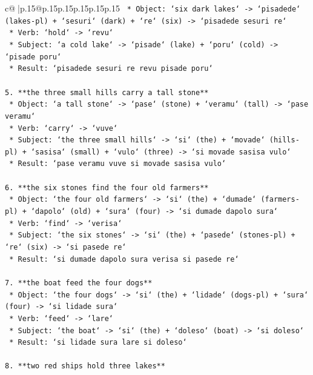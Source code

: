 \documentclass{article}
\begin{document}
{\begin{supertabular}{c@{$\;$}|p{.15\linewidth}@{}p{.15\linewidth}p{.15\linewidth}p{.15\linewidth}p{.15\linewidth}p{.15\linewidth}}
{{{\texttt{    *   Object: `six dark lakes` {-}> `pisadede` (lakes{-}pl) + `sesuri` (dark) + `re` (six) {-}> `pisadede sesuri re`} \\
\texttt{    *   Verb: `hold` {-}> `revu`} \\
\texttt{    *   Subject: `a cold lake` {-}> `pisade` (lake) + `poru` (cold) {-}> `pisade poru`} \\
\texttt{    *   Result: `pisadede sesuri re revu pisade poru`} \\
\\ 
\texttt{5.  **the three small hills carry a tall stone**} \\
\texttt{    *   Object: `a tall stone` {-}> `pase` (stone) + `veramu` (tall) {-}> `pase veramu`} \\
\texttt{    *   Verb: `carry` {-}> `vuve`} \\
\texttt{    *   Subject: `the three small hills` {-}> `si` (the) + `movade` (hills{-}pl) + `sasisa` (small) + `vulo` (three) {-}> `si movade sasisa vulo`} \\
\texttt{    *   Result: `pase veramu vuve si movade sasisa vulo`} \\
\\ 
\texttt{6.  **the six stones find the four old farmers**} \\
\texttt{    *   Object: `the four old farmers` {-}> `si` (the) + `dumade` (farmers{-}pl) + `dapolo` (old) + `sura` (four) {-}> `si dumade dapolo sura`} \\
\texttt{    *   Verb: `find` {-}> `verisa`} \\
\texttt{    *   Subject: `the six stones` {-}> `si` (the) + `pasede` (stones{-}pl) + `re` (six) {-}> `si pasede re`} \\
\texttt{    *   Result: `si dumade dapolo sura verisa si pasede re`} \\
\\ 
\texttt{7.  **the boat feed the four dogs**} \\
\texttt{    *   Object: `the four dogs` {-}> `si` (the) + `lidade` (dogs{-}pl) + `sura` (four) {-}> `si lidade sura`} \\
\texttt{    *   Verb: `feed` {-}> `lare`} \\
\texttt{    *   Subject: `the boat` {-}> `si` (the) + `doleso` (boat) {-}> `si doleso`} \\
\texttt{    *   Result: `si lidade sura lare si doleso`} \\
\\ 
\texttt{8.  **two red ships hold three lakes**} \\
}}}
\end{supertabular}}
\end{document}
